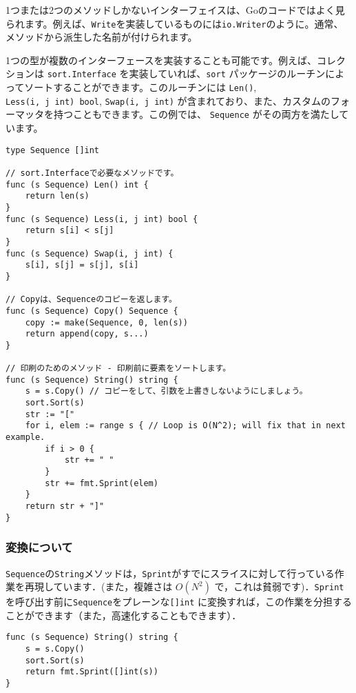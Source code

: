 \documentclass{jsarticle}
\begin{document}
1つまたは2つのメソッドしかないインターフェイスは、Goのコードではよく見られます。例えば、\texttt{Write}を実装しているものには\texttt{io.Writer}のように。通常、メソッドから派生した名前が付けられます。

1つの型が複数のインターフェースを実装することも可能です。例えば、コレクションは
\texttt{sort.Interface} を実装していれば、\texttt{sort}
パッケージのルーチンによってソートすることができます。このルーチンには
\texttt{Len()}, \texttt{Less(i,\ j\ int)\ bool},
\texttt{Swap(i,\ j\ int)}
が含まれており、また、カスタムのフォーマッタを持つこともできます。この例では、
\texttt{Sequence} がその両方を満たしています。

\begin{lstlisting}[numbers=none]
type Sequence []int

// sort.Interfaceで必要なメソッドです。
func (s Sequence) Len() int {
    return len(s)
}
func (s Sequence) Less(i, j int) bool {
    return s[i] < s[j]
}
func (s Sequence) Swap(i, j int) {
    s[i], s[j] = s[j], s[i]
}

// Copyは、Sequenceのコピーを返します。
func (s Sequence) Copy() Sequence {
    copy := make(Sequence, 0, len(s))
    return append(copy, s...)
}

// 印刷のためのメソッド - 印刷前に要素をソートします。
func (s Sequence) String() string {
    s = s.Copy() // コピーをして、引数を上書きしないようにしましょう。
    sort.Sort(s)
    str := "["
    for i, elem := range s { // Loop is O(N^2); will fix that in next example.
        if i > 0 {
            str += " "
        }
        str += fmt.Sprint(elem)
    }
    return str + "]"
}
\end{lstlisting}

\subsubsection{変換について}

\texttt{Sequence}の\texttt{String}メソッドは，\texttt{Sprint}がすでにスライスに対して行っている作業を再現しています．(また，複雑さは $O(N^2)$ で，これは貧弱です)．\texttt{Sprint}を呼び出す前に\texttt{Sequence}をプレーンな\texttt{[]int}
に変換すれば，この作業を分担することができます（また，高速化することもできます）．

\begin{lstlisting}[numbers=none]
func (s Sequence) String() string {
    s = s.Copy()
    sort.Sort(s)
    return fmt.Sprint([]int(s))
}
\end{lstlisting}
\end{document}
